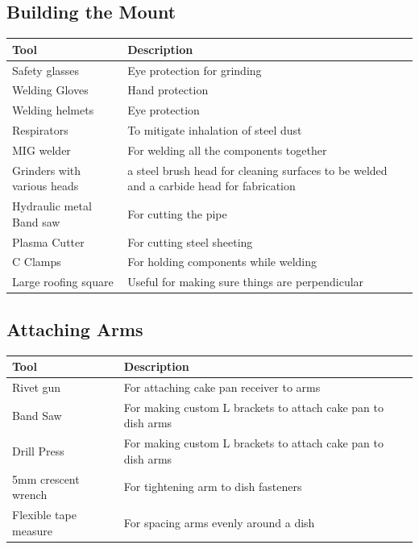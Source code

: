 \documentclass[11pt]{article} %
\begin{document}
\subsection{Building the Mount}

\begin{tabular}{| l | p{10cm} |}
\hline
\textbf{Tool} & \textbf{Description} \\ \hline \hline
Safety glasses & Eye protection for grinding \\ \hline
Welding Gloves & Hand protection \\ \hline
Welding helmets & Eye protection \\ \hline
Respirators & To mitigate inhalation of steel dust \\ \hline
MIG welder & For welding all the components together \\ \hline
Grinders with various heads & a steel brush head for cleaning surfaces to be welded and a carbide head for fabrication \\ \hline
Hydraulic metal Band saw & For cutting the pipe \\ \hline
Plasma Cutter & For cutting steel sheeting \\ \hline
C Clamps & For holding components while welding \\ \hline
Large roofing square & Useful for making sure things are perpendicular \\ \hline
\end{tabular}


\subsection{Attaching Arms}

\begin{tabular}{| l | p{10cm} |}
\hline
\textbf{Tool} & \textbf{Description} \\ \hline \hline
Rivet gun & For attaching cake pan receiver to arms \\ \hline
Band Saw & For making custom L brackets to attach cake pan to dish arms \\ \hline
Drill Press & For making custom L brackets to attach cake pan to dish arms \\ \hline
5mm crescent wrench & For tightening arm to dish fasteners \\ \hline
Flexible tape measure & For spacing arms evenly around a dish \\ \hline
\end{tabular}
\end{document}
